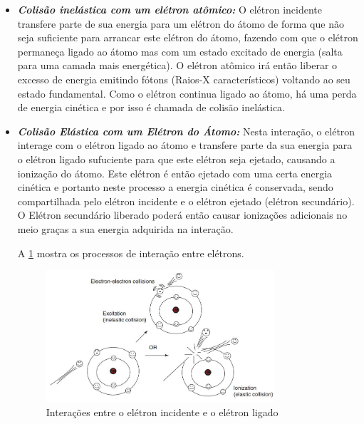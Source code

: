 \documentclass[11pt,a4paper]{article}
\begin{document}
    \begin{itemize}
		\item \textbf{\textit{\textcolor{CarnationPink}{Colisão inelástica com um elétron atômico}:}} O elétron incidente transfere parte de sua energia para um elétron do átomo de forma que não seja suficiente para arrancar este elétron do átomo, fazendo com que o elétron permaneça ligado ao átomo mas com um estado excitado de energia (salta para uma camada mais energética). O elétron atômico irá então liberar o excesso de energia emitindo fótons (Raios-X característicos) voltando ao seu estado fundamental. Como o elétron continua ligado ao átomo, há uma perda de energia cinética e por isso é chamada de colisão inelástica. 
		

		\item \textbf{\textit{\textcolor{CarnationPink}{Colisão Elástica com um Elétron do Átomo}:}} Nesta interação, o elétron interage com o elétron ligado ao átomo e transfere parte da sua energia para o elétron ligado sufuciente para que este elétron seja ejetado, causando a ionização do átomo. Este elétron é então ejetado com uma certa energia cinética e portanto neste processo a energia cinética é conservada, sendo compartilhada pelo elétron incidente e o elétron ejetado (elétron secundário). O Elétron secundário liberado poderá então causar ionizações adicionais no meio graças a sua energia adquirida na interação.
		
		A \ref{fig:interacaoEletronComEletron} mostra os processos de interação entre elétrons. 

		\begin{figure}[h]
			\centering
			\includegraphics[width=0.8\textwidth]{Imagens/interacaoEletronComEletron.JPG}
			\caption{Interações entre o elétron incidente e o elétron ligado}
			\label{fig:interacaoEletronComEletron}                
		\end{figure}
		



\end{itemize}
\end{document}
